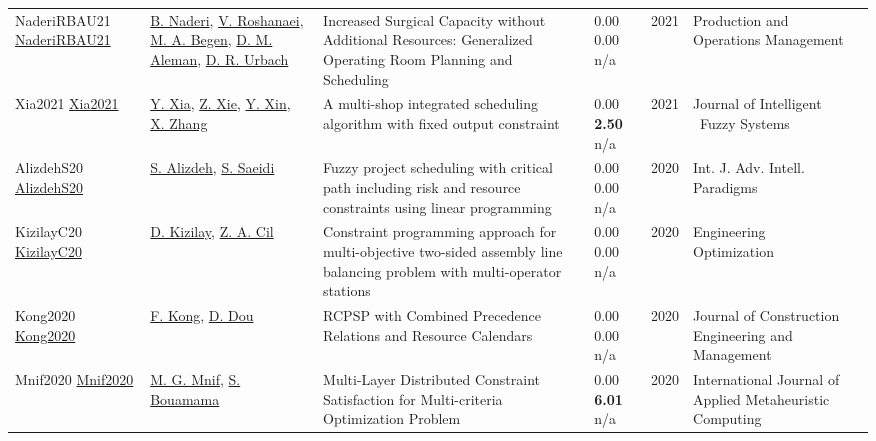{\begin{longtable}{p{3cm}p{5cm}p{10cm}p{1cm}rp{2.5cm}l}
NaderiRBAU21 \href{http://dx.doi.org/10.1111/poms.13397}{NaderiRBAU21} & \hyperref[auth:a725]{B. Naderi}, \hyperref[auth:a727]{V. Roshanaei}, \hyperref[auth:a835]{M. A. Begen}, \hyperref[auth:a894]{D. M. Aleman}, \hyperref[auth:a895]{D. R. Urbach} & Increased Surgical Capacity without Additional Resources: Generalized Operating Room Planning and Scheduling & \noindent{}\textcolor{black!50}{0.00} \textcolor{black!50}{0.00} n/a & 2021 & \cellcolor{red!20}Production and Operations Management & \cite{NaderiRBAU21}\\
Xia2021 \href{http://dx.doi.org/10.3233/jifs-189721}{Xia2021} & \hyperref[auth:a1538]{Y. Xia}, \hyperref[auth:a1539]{Z. Xie}, \hyperref[auth:a1540]{Y. Xin}, \hyperref[auth:a1541]{X. Zhang} & A multi-shop integrated scheduling algorithm with fixed output constraint & \noindent{}\textcolor{black!50}{0.00} \textbf{2.50} n/a & 2021 & Journal of Intelligent \  Fuzzy Systems & \cite{Xia2021}\\
AlizdehS20 \href{https://doi.org/10.1504/IJAIP.2020.106687}{AlizdehS20} & \hyperref[auth:a512]{S. Alizdeh}, \hyperref[auth:a513]{S. Saeidi} & Fuzzy project scheduling with critical path including risk and resource constraints using linear programming & \noindent{}\textcolor{black!50}{0.00} \textcolor{black!50}{0.00} n/a & 2020 & \cellcolor{red!20}Int. J. Adv. Intell. Paradigms & \cite{AlizdehS20}\\
KizilayC20 \href{http://dx.doi.org/10.1080/0305215x.2020.1786081}{KizilayC20} & \hyperref[auth:a1379]{D. Kizilay}, \hyperref[auth:a1380]{Z. A. Cil} & Constraint programming approach for multi-objective two-sided assembly line balancing problem with multi-operator stations & \noindent{}\textcolor{black!50}{0.00} \textcolor{black!50}{0.00} n/a & 2020 & \cellcolor{red!20}Engineering Optimization & \cite{KizilayC20}\\
Kong2020 \href{http://dx.doi.org/10.1061/(asce)co.1943-7862.0001929}{Kong2020} & \hyperref[auth:a1704]{F. Kong}, \hyperref[auth:a1777]{D. Dou} & RCPSP with Combined Precedence Relations and Resource Calendars & \noindent{}\textcolor{black!50}{0.00} \textcolor{black!50}{0.00} n/a & 2020 & Journal of Construction Engineering and Management & \cite{Kong2020}\\
Mnif2020 \href{http://dx.doi.org/10.4018/ijamc.2020040107}{Mnif2020} & \hyperref[auth:a1961]{M. G. Mnif}, \hyperref[auth:a1962]{S. Bouamama} & Multi-Layer Distributed Constraint Satisfaction for Multi-criteria Optimization Problem & \noindent{}\textcolor{black!50}{0.00} \textbf{6.01} n/a & 2020 & International Journal of Applied Metaheuristic Computing & \cite{Mnif2020}\\

\end{longtable}}
